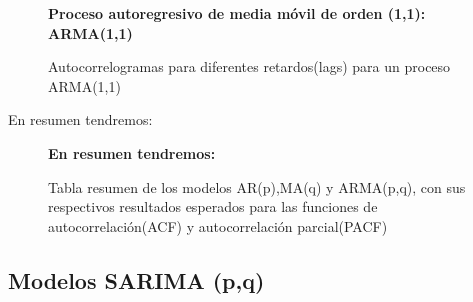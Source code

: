 \begin{figure}[H]
	\centering
	\textbf{Proceso autoregresivo de media móvil de orden (1,1): ARMA(1,1)}\par\medskip
	\caption{Autocorrelogramas para diferentes retardos(lags) para un proceso ARMA(1,1)}\label{fig16}
\end{figure}


En resumen tendremos:

\begin{figure}[H]
	\centering
	\textbf{En resumen tendremos:}\par\medskip
	\caption{Tabla resumen de los modelos AR(p),MA(q) y ARMA(p,q), con sus respectivos resultados esperados para las funciones de autocorrelación(ACF) y autocorrelación parcial(PACF)}\label{fig14}
\end{figure}

\subsection{Modelos SARIMA (p,q)}

